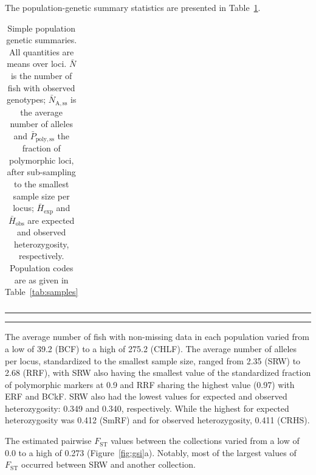 The population-genetic summary statistics are presented in Table~\ref{tab:pg-summ}.
\begin{table}
\caption{\footnotesize Simple population genetic summaries. All quantities are means
over loci.  $\bar{N}$ is the number of fish with observed genotypes; $\bar{N}_\mathrm{A,ss}$ is the
average number of alleles and $\bar{P}_\mathrm{poly,ss}$ the fraction of polymorphic loci,
after sub-sampling to the smallest sample size per locus; $\bar{H}_\mathrm{exp}$ and
$\bar{H}_\mathrm{obs}$ are expected and observed heterozygosity, respectively. Population
codes are as given in Table~\ref{tab:samples}}
\label{tab:pg-summ}
{\footnotesize
\begin{tabular*}{\columnwidth}{@{\extracolsep{\fill}} lrrrrr}
\hline\hline

\end{tabular*}
}
\vspace*{-2.3ex}\hrule\vspace*{0.3ex}\hrule
\end{table}
The average number of fish with non-missing data in each population varied from
a low of 39.2 (BCF) to a high of 275.2 (CHLF).  The average number of alleles
per locus, standardized to the smallest sample size, ranged from 2.35 (SRW) to
2.68 (RRF), with  SRW also having the smallest value of the
standardized fraction of polymorphic markers at 0.9 and RRF sharing the highest value
(0.97) with ERF and BCkF.
SRW also had the lowest values for expected and observed heterozygosity:
0.349 and 0.340, respectively. While the highest for expected heterozygosity
was 0.412 (SmRF) and for observed heterozygosity, 0.411 (CRHS).

The estimated pairwise $F_\mathrm{ST}$ values between the collections
varied from a low of 0.0 to a high of 0.273 (Figure~\ref{fig:gsi}a).
Notably, most of the largest values
of $F_\mathrm{ST}$ occurred between SRW and another collection.  

